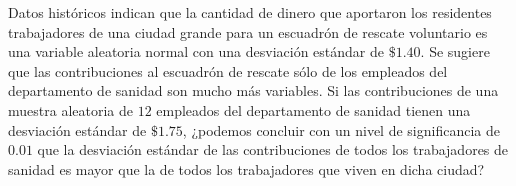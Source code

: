 \begin{enunciado}
 Datos hist\'oricos indican que la cantidad de dinero que aportaron los residentes
 trabajadores de una ciudad grande para un escuadr\'on de rescate voluntario es
 una variable aleatoria normal con una desviaci\'on est\'andar de $\$1.40$.
 Se sugiere que las contribuciones al escuadr\'on de rescate s\'olo
 de los empleados del departamento de sanidad son mucho m\'as variables.
 Si las contribuciones de una muestra aleatoria de $12$ empleados
 del departamento de sanidad tienen una desviaci\'on est\'andar de $\$1.75$,
 ¿podemos concluir con un nivel de significancia de $0.01$
 que la desviaci\'on est\'andar de las contribuciones
 de todos los trabajadores de sanidad es mayor que la de todos los trabajadores
 que viven en dicha ciudad?
\end{enunciado}

